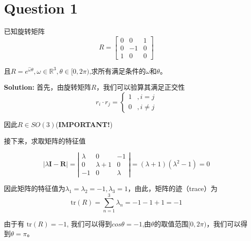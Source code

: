 \documentclass{ctexart}
\begin{document}



\newpage


\newpage
\pagestyle{fancy}
\fancyhf{}
\fancyfoot[C]{\thepage}
\section*{Question 1}
已知旋转矩阵
\begin{equation*}
	R = \begin{bmatrix}
		0 & 0 & 1 \\
		0 & -1 & 0 \\
		1 & 0 & 0
	\end{bmatrix}
\end{equation*}

且$R = e^{\hat{\omega}\theta},\omega \in \mathbb{R}^3 , \theta \in [0,2\pi )$,求所有满足条件的$\omega$和$\theta$。

\textbf{Solution:}
首先，由旋转矩阵$R$，我们可以验算其满足正交性
\begin{equation*}
	r_i \cdot r_j = \begin{cases}
		1 & ,i = j \\
		0 & ,i \neq j
	\end{cases}
\end{equation*}

因此\textcolor{cherry}{$R \in SO(3)$}(\textbf{IMPORTANT!})

接下来，求取矩阵的特征值

\begin{equation}
	|\lambda \boldsymbol{I} -\boldsymbol{R}| = \left| \begin{matrix}
		\lambda & 0 & -1 \\
		0 & \lambda+1 & 0 \\
		-1 & 0 & \lambda
	\end{matrix} \right| = (\lambda+1)(\lambda^2 - 1) = 0
\end{equation}

因此矩阵的特征值为$\lambda_1 = \lambda_2 = -1,\lambda_3 = 1$，由此，矩阵的迹（trace）为
\begin{equation}
	\text{tr}(R) = \sum_{n = 1}^{3} \lambda_n = -1-1+1 = -1
\end{equation}

由于有 $\text{tr}(R) = -1$, 我们可以得到$cos \theta =-1$,由$\theta$的取值范围$[0,2\pi)$，我们可以得到$\theta = \pi$。
\end{document}
